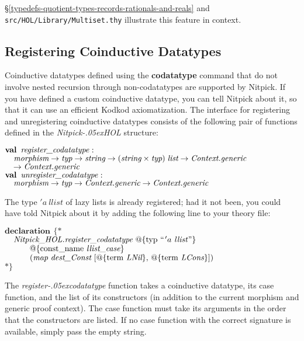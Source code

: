 \documentclass[a4paper,12pt]{article}
\renewcommand\_{\hbox{\textunderscore\kern-.05ex}}
\begin{document}
\S\ref{typedefs-quotient-types-records-rationals-and-reals} and
\texttt{src/HOL/Library/Multiset.thy} illustrate this feature in context.

\subsection{Registering Coinductive Datatypes}
\label{registering-coinductive-datatypes}

Coinductive datatypes defined using the \textbf{codatatype} command that do not
involve nested recursion through non-codatatypes are supported by Nitpick.
If you have defined a custom coinductive datatype, you can tell Nitpick about
it, so that it can use an efficient Kodkod axiomatization. The interface for
registering and unregistering coinductive datatypes consists of the following
pair of functions defined in the \textit{Nitpick\_HOL} structure:

\prew
$\textbf{val}\,~\textit{register\_codatatype\/} : {}$ \\
$\hbox{}\quad\textit{morphism} \rightarrow \textit{typ} \rightarrow \textit{string} \rightarrow (\textit{string} \times \textit{typ})\;\textit{list} \rightarrow \textit{Context.generic} {}$ \\
$\hbox{}\quad{\rightarrow}\; \textit{Context.generic}$ \\
$\textbf{val}\,~\textit{unregister\_codatatype\/} : {}$ \\
$\hbox{}\quad\textit{morphism} \rightarrow \textit{typ} \rightarrow \textit{Context.generic} \rightarrow \textit{Context.generic} {}$
\postw

The type $'a~\textit{llist}$ of lazy lists is already registered; had it
not been, you could have told Nitpick about it by adding the following line
to your theory file:

\prew
$\textbf{declaration}~\,\{{*}$ \\
$\hbox{}\quad\textit{Nitpick\_HOL.register\_codatatype}~@\{\antiq{typ}~``\kern1pt'a~\textit{llist\/}\textrm{''}\}$ \\
$\hbox{}\qquad\quad @\{\antiq{const\_name}~ \textit{llist\_case}\}$ \\
$\hbox{}\qquad\quad (\textit{map}~\textit{dest\_Const}~[@\{\antiq{term}~\textit{LNil}\},\, @\{\antiq{term}~\textit{LCons}\}])$ \\
${*}\}$
\postw

The \textit{register\_codatatype} function takes a coinductive datatype, its
case function, and the list of its constructors (in addition to the current
morphism and generic proof context). The case function must take its arguments
in the order that the constructors are listed. If no case function with the
correct signature is available, simply pass the empty string.
\end{document}
